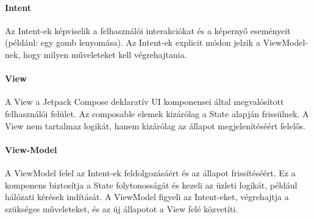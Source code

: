 \paragraph{Intent}
Az Intent-ek képviselik a felhasználói interakciókat és a képernyő eseményeit (például: egy gomb lenyomása). 
Az Intent-ek explicit módon jelzik a ViewModel-nek, hogy milyen műveleteket kell végrehajtania.

\paragraph{View}
A View a Jetpack Compose deklaratív UI komponensei által megvalósított felhasználói felület.
Az composable elemek kizárólag a State alapján frissülnek.
A View nem tartalmaz logikát, hanem kizárólag az állapot megjelenítéséért felelős.


\paragraph{View-Model}
A ViewModel felel az Intent-ek feldolgozásáért és az állapot frissítéséért. 
Ez a komponens biztosítja a State folytonosságát és kezeli az üzleti logikát,
például hálózati kérések indítását.
A ViewModel figyeli az Intent-eket, végrehajtja a szükséges műveleteket, és az új állapotot a View felé közvetíti.




